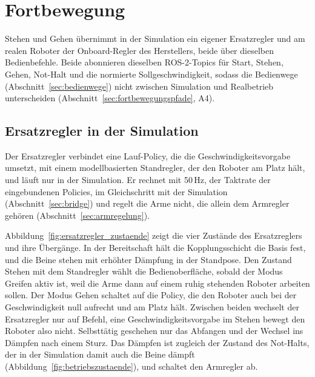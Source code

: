 \section{Fortbewegung}
\label{sec:fortbewegung_umsetzung}
Stehen und Gehen übernimmt in der Simulation ein eigener Ersatzregler und am realen Roboter der Onboard-Regler des Herstellers, beide über dieselben Bedienbefehle.
Beide abonnieren dieselben ROS-2-Topics für Start, Stehen, Gehen, Not-Halt und die normierte Sollgeschwindigkeit, sodass die Bedienwege (Abschnitt~\ref{sec:bedienwege}) nicht zwischen Simulation und Realbetrieb unterscheiden (Abschnitt~\ref{sec:fortbewegungspfade}, A4).

\subsection{Ersatzregler in der Simulation}
\label{sec:ersatzregler}
Der Ersatzregler verbindet eine Lauf-Policy, die die Geschwindigkeitsvorgabe umsetzt, mit einem modellbasierten Standregler, der den Roboter am Platz hält, und läuft nur in der Simulation.
Er rechnet mit 50\,Hz, der Taktrate der eingebundenen Policies, im Gleichschritt mit der Simulation (Abschnitt~\ref{sec:bridge}) und regelt die Arme nicht, die allein dem Armregler gehören (Abschnitt~\ref{sec:armregelung}).

Abbildung~\ref{fig:ersatzregler_zustaende} zeigt die vier Zustände des Ersatzreglers und ihre Übergänge.
In der Bereitschaft hält die Kopplungsschicht die Basis fest, und die Beine stehen mit erhöhter Dämpfung in der Standpose.
Den Zustand Stehen mit dem Standregler wählt die Bedienoberfläche, sobald der Modus Greifen aktiv ist, weil die Arme dann auf einem ruhig stehenden Roboter arbeiten sollen.
Der Modus Gehen schaltet auf die Policy, die den Roboter auch bei der Geschwindigkeit null aufrecht und am Platz hält.
Zwischen beiden wechselt der Ersatzregler nur auf Befehl, eine Geschwindigkeitsvorgabe im Stehen bewegt den Roboter also nicht.
Selbsttätig geschehen nur das Abfangen und der Wechsel ins Dämpfen nach einem Sturz.
Das Dämpfen ist zugleich der Zustand des Not-Halts, der in der Simulation damit auch die Beine dämpft (Abbildung~\ref{fig:betriebszustaende}), und schaltet den Armregler ab.

